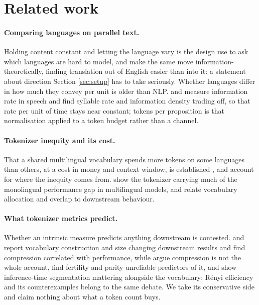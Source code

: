 \documentclass[11pt]{article}
\begin{document}
\section{Related work}
\label{sec:related}

\paragraph{Comparing languages on parallel text.} Holding content constant and letting
the language vary is the design \citet{mielke-etal-2019-kind} use to ask which languages
are hard to model, and \citet{bugliarello-etal-2020-easier} make the same move
information-theoretically, finding translation out of English easier than into it: a
statement about direction Section \ref{sec:setup} has to take seriously. Whether languages
differ in how much they convey per unit is older than NLP.
\citet{pellegrino-etal-2011-cross} and \citet{coupe-etal-2019-different} measure
information rate in speech and find syllable rate and information density trading off, so
that rate per unit of time stays near constant; tokens per proposition is that
normalisation applied to a token budget rather than a channel.

\paragraph{Tokenizer inequity and its cost.} That a shared multilingual vocabulary spends
more tokens on some languages than others, at a cost in money and context window, is
established \citep{petrov-etal-2023-tokenizers,ahia-etal-2023-languages}, and
\citet{arnett-etal-2025-inequities} account for where the inequity comes from.
\citet{rust-etal-2021-good} show the tokenizer carrying much of the monolingual
performance gap in multilingual models, and \citet{limisiewicz-etal-2023-tokenization}
relate vocabulary allocation and overlap to downstream behaviour.

\paragraph{What tokenizer metrics predict.} Whether an intrinsic measure predicts anything
downstream is contested. \citet{bostrom-durrett-2020-byte} and
\citet{gowda-may-2020-finding} report vocabulary construction and size changing downstream
results and \citet{goldman-etal-2024-unpacking} find compression correlated with
performance, while \citet{schmidt-etal-2024-tokenization} argue compression is not the
whole account, \citet{ali-etal-2024-tokenizer} find fertility and parity unreliable
predictors of it, and \citet{uzan-etal-2024-greed} show inference-time segmentation
mattering alongside the vocabulary; R\'enyi efficiency
\citep{zouhar-etal-2023-tokenization} and its counterexamples
\citep{cognetta-etal-2024-counterexamples} belong to the same debate. We take its
conservative side and claim nothing about what a token count buys.
\end{document}
